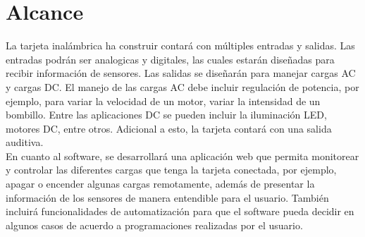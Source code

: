\chapter{Alcance}

La tarjeta inalámbrica ha construir contará con múltiples entradas y salidas. Las entradas podrán ser analogicas y digitales, las cuales estarán diseñadas para recibir información de sensores. Las salidas se diseñarán para manejar cargas AC y cargas DC. El manejo de las cargas AC debe incluir regulación de potencia, por ejemplo, para variar la velocidad de un motor, variar la intensidad de un bombillo. Entre las aplicaciones DC se pueden incluir la iluminación LED, motores DC, entre otros. Adicional a esto, la tarjeta contará con una salida auditiva.\\

En cuanto al software, se desarrollará una aplicación web que permita monitorear y controlar las diferentes cargas que tenga la tarjeta conectada, por ejemplo, apagar o encender algunas cargas remotamente, además de presentar la información de los sensores de manera entendible para el usuario. También incluirá funcionalidades de automatización para que el software pueda decidir en algunos casos de acuerdo a programaciones realizadas por el usuario.\\

